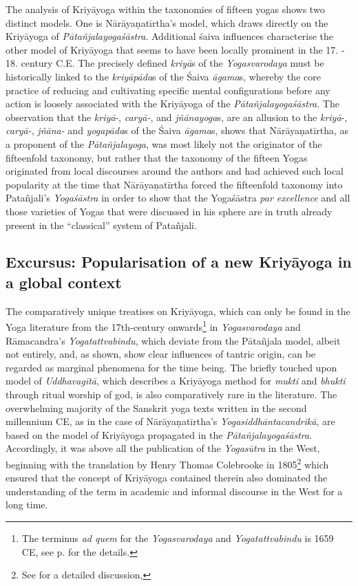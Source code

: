 The analysis of Kriyāyoga within the taxonomies of fifteen yogas shows two distinct models. One is Nārāyaṇatīrtha's model, which draws directly on the Kriyāyoga of \textit{Pātañjalayogaśāstra}. Additional śaiva influences characterise the other model of Kriyāyoga that seems to have been locally prominent in the 17. - 18. century C.E. The precisely defined \textit{kriyā}s of the \textit{Yogasvarodaya} must be historically linked to the \textit{kriyāpāda}s of the Śaiva \textit{āgama}s, whereby the core practice of reducing and cultivating specific mental configurations before any action is loosely associated with the Kriyāyoga of the \textit{Pātañjalayogaśāstra}. The observation that the \textit{kriyā}-, \textit{caryā-}, and \textit{jñānayoga}s, are an allusion to the \textit{kriyā}-, \textit{caryā-}, \textit{jñāna-} and \textit{yogapāda}s of the Śaiva \textit{āgama}s, shows that Nārāyaṇatīrtha, as a proponent of the \textit{Pātañjalayoga}, was most likely not the originator of the fifteenfold taxonomy, but rather that the taxonomy of the fifteen Yogas originated from local discourses around the authors and had achieved such local popularity at the time that Nārāyaṇatīrtha forced the fifteenfold taxonomy into Patañjali's \textit{Yogaśāstra} in order to show that the Yogaśāstra \textit{par excellence} and all those varieties of Yogas that were discussed in his sphere are in truth already present in the ``classical'' system of Patañjali.

\subsection{Excursus: Popularisation of a new Kriyāyoga in a global context}

The comparatively unique treatises on Kriyāyoga, which can only be found in the Yoga literature from the 17th-century onwards\footnote{The terminus \textit{ad quem} for the \textit{Yogasvarodaya} and \textit{Yogatattvabindu} is 1659 CE, see p.\pageref{dating} for the details.} in \textit{Yogasvarodaya} and Rāmacandra's \textit{Yogatattvabindu}, which deviate from the Pātañjala model, albeit not entirely, and, as shown, show clear influences of tantric origin, can be regarded as marginal phenomena for the time being. The briefly touched upon model of \textit{Uddhavagītā}, which describes a Kriyāyoga method for \textit{mukti} and \textit{bhukti} through ritual worship of god, is also comparatively rare in the literature. The overwhelming majority of the Sanskrit yoga texts written in the second millennium CE, as in the case of Nārāyaṇatīrtha's \textit{Yogasiddhāntacandrikā}, are based on the model of Kriyāyoga propagated in the \textit{Pātañjalayogaśāstra}. Accordingly, it was above all the publication of the \textit{Yogasūtra} in the West, beginning with the translation by Henry Thomas Colebrooke in 1805\footnote{See \parencite{colebrooke2014} for a detailed discussion,} which ensured that the concept of Kriyāyoga contained therein also dominated the understanding of the term in academic and informal discourse in the West for a long time. 

